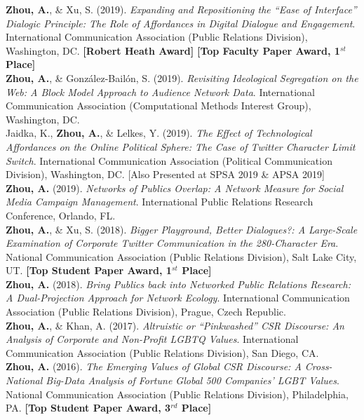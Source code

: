 \documentclass[12pt, letterpaper]{article}
\newcommand{\years}[1]{\marginnote{\normalsize #1}}
\begin{document}
{  \years{[8]} \textbf{Zhou, A.}, \& Xu, S. (2019). \textit{Expanding and Repositioning the ``Ease of Interface'' Dialogic Principle: The Role of Affordances in Digital Dialogue and Engagement}. International Communication Association (Public Relations Division), Washington, DC. \textbf{[Robert Heath Award]} \textbf{[Top Faculty Paper Award, 1$^{st}$ Place]}\\
  \years{[7]} \textbf{Zhou, A.}, \& González-Bailón, S. (2019). \textit{Revisiting Ideological Segregation on the Web: A Block Model Approach to Audience Network Data}. International Communication Association (Computational Methods Interest Group), Washington, DC.\\
  \years{[6]} Jaidka, K., \textbf{Zhou, A.}, \& Lelkes, Y. (2019). \textit{The Effect of Technological Affordances on the Online Political Sphere: The Case of Twitter Character Limit Switch}. International Communication Association (Political Communication Division), Washington, DC. [Also Presented at SPSA 2019 \& APSA 2019]\\
  \years{[5]} \textbf{Zhou, A.} (2019). \textit{Networks of Publics Overlap: A Network Measure for Social Media Campaign Management}. International Public Relations Research Conference, Orlando, FL.\\
  \years{[4]} \textbf{Zhou, A.}, \& Xu, S. (2018). \textit{Bigger Playground, Better Dialogues?: A Large-Scale Examination of Corporate Twitter Communication in the 280-Character Era}. National Communication Association (Public Relations Division), Salt Lake City, UT. \textbf{[Top Student Paper Award, 1$^{st}$ Place]}\\
  \years{[3]} \textbf{Zhou, A.} (2018). \textit{Bring Publics back into Networked Public Relations Research: A Dual-Projection Approach for Network Ecology}. International Communication Association (Public Relations Division), Prague, Czech Republic.\\
  \years{[2]} \textbf{Zhou, A.}, \& Khan, A. (2017). \textit{Altruistic or ``Pinkwashed'' CSR Discourse: An Analysis of Corporate and Non-Profit LGBTQ Values}. International Communication Association (Public Relations Division), San Diego, CA.\\
  \years{[1]} \textbf{Zhou, A.} (2016). \textit{The Emerging Values of Global CSR Discourse: A Cross-National Big-Data Analysis of Fortune Global 500 Companies' LGBT Values}. National Communication Association (Public Relations Division), Philadelphia, PA. \textbf{[Top Student Paper Award, 3$^{rd}$ Place]}

}
\end{document}
